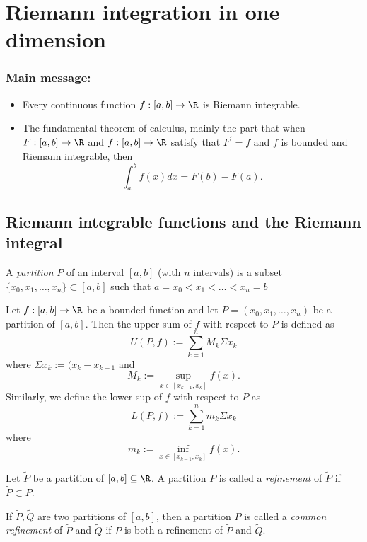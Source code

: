 \section{Riemann integration in one dimension}
\subsubsection*{Main message:}
\begin{itemize}
    \item Every continuous function $f: [a,b] \to \R$ is Riemann integrable.
    \item The fundamental theorem of calculus, mainly the part that when
        $F:[a,b] \to \R$ and $f:[a,b] \to \R$ satisfy that $F^\prime = f$
        and $f$ is bounded and Riemann integrable, then
        $$\int_a^bf(x)dx = F(b)-F(a).$$
\end{itemize}

\subsection{Riemann integrable functions and the Riemann integral}
\begin{definition}[Partition]
    A \emph{partition} $P$ of an interval $[a,b]$ (with $n$ intervals) is
    a subset $\{x_0,x_1,\dots,x_n\} \subset [a,b]$ such that $a=x_0<x_1<\dots<x_n=b$
\end{definition}

\begin{definition}
    Let $f:[a,b] \to \R$ be a bounded function and let $P = (x_0,x_1,\dots,x_n)$
    be a partition of $[a,b]$. Then the upper sum of $f$ with respect to $P$ is
    defined as
    $$U(P,f) := \sum_{k=1}^n M_k \Sigma x_k$$
    where $\Sigma x_k := (x_k - x_{k-1}$ and
    $$M_k := \sup_{x\in[x_{k-1},x_k]}f(x).$$
    Similarly, we define the lower sup of $f$ with respect to $P$ as
    $$L(P,f) := \sum_{k=1}^n m_k \Sigma x_k$$
    where
    $$m_k := \inf_{x\in[x_{k-1},x_k]}f(x).$$
\end{definition}

\begin{definition}[Refinement]
    Let $\tilde{P}$ be a partition of $[a,b] \subseteq \R$. A partition $P$ is called
    a \emph{refinement} of $\tilde{P}$ if $\tilde{P} \subset P$.

    If $\tilde{P}, \tilde{Q}$ are two partitions of $[a,b]$, then a partition $P$ is
    called a \emph{common refinement} of $\tilde{P}$ and $\tilde{Q}$ if $P$ is both
    a refinement of $\tilde{P}$ and $\tilde{Q}$.
\end{definition}

